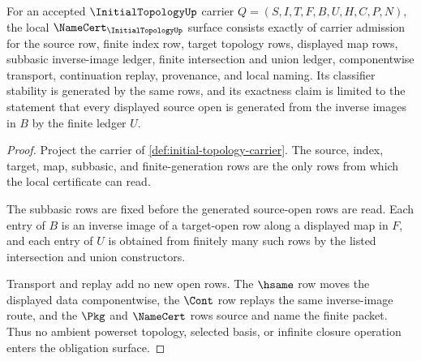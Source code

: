 \begin{theorem}
\label{thm:initial-topology-namecert-obligations}
For an accepted $\InitialTopologyUp$ carrier $Q=(S,I,T,F,B,U,H,C,P,N)$, the local $\NameCert_{\InitialTopologyUp}$ surface consists exactly of carrier admission for the source row, finite index row, target topology rows, displayed map rows, subbasic inverse-image ledger, finite intersection and union ledger, componentwise transport, continuation replay, provenance, and local naming. Its classifier stability is generated by the same rows, and its exactness claim is limited to the statement that every displayed source open is generated from the inverse images in $B$ by the finite ledger $U$.
\end{theorem}
\begin{proof}
Project the carrier of \autoref{def:initial-topology-carrier}. The source, index, target, map, subbasic, and finite-generation rows are the only rows from which the local certificate can read.

The subbasic rows are fixed before the generated source-open rows are read. Each entry of $B$ is an inverse image of a target-open row along a displayed map in $F$, and each entry of $U$ is obtained from finitely many such rows by the listed intersection and union constructors.

Transport and replay add no new open rows. The $\hsame$ row moves the displayed data componentwise, the $\Cont$ row replays the same inverse-image route, and the $\Pkg$ and $\NameCert$ rows source and name the finite packet. Thus no ambient powerset topology, selected basis, or infinite closure operation enters the obligation surface.
\end{proof}

